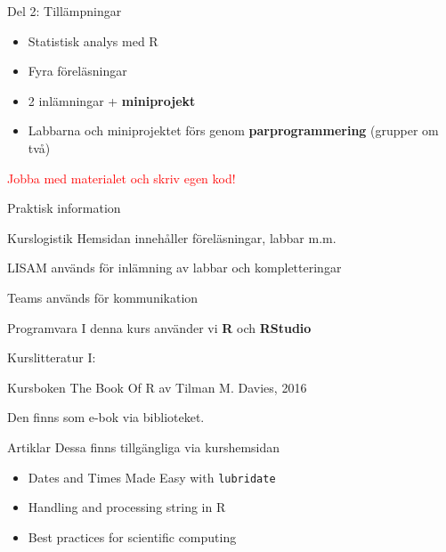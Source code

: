 \documentclass[
  10pt,
  ignorenonframetext,
]{beamer}
\providecommand{\tightlist}{%
  \setlength{\itemsep}{0pt}\setlength{\parskip}{0pt}}
\begin{document}
\begin{frame}{Del 2: Tillämpningar}
\protect\hypertarget{del-2-tilluxe4mpningar}{}
\begin{itemize}
\tightlist
\item
  Statistisk analys med R
\item
  Fyra föreläsningar
\item
  2 inlämningar + \textbf{miniprojekt}
\item
  Labbarna och miniprojektet förs genom \textbf{parprogrammering} (grupper om två)
\end{itemize}

\pause

\textcolor{red}{Jobba med materialet och skriv egen kod!}
\end{frame}

\begin{frame}{Praktisk information}
\protect\hypertarget{praktisk-information}{}
\begin{block}{Kurslogistik}
\protect\hypertarget{kurslogistik}{}
Hemsidan innehåller föreläsningar, labbar m.m.

LISAM används för inlämning av labbar och kompletteringar

Teams används för kommunikation
\end{block}

\begin{block}{Programvara}
\protect\hypertarget{programvara}{}
I denna kurs använder vi \textbf{R} och \textbf{RStudio}
\end{block}
\end{frame}

\begin{frame}{Kurslitteratur I:}
\protect\hypertarget{kurslitteratur-i}{}
\begin{block}{Kursboken}
\protect\hypertarget{kursboken}{}
The Book Of R av Tilman M. Davies, 2016

Den finns som e-bok via biblioteket.
\end{block}

\begin{block}{Artiklar}
\protect\hypertarget{artiklar}{}
Dessa finns tillgängliga via kurshemsidan

\begin{itemize}
\tightlist
\item
  Dates and Times Made Easy with \texttt{lubridate}
\item
  Handling and processing string in R
\item
  Best practices for scientific computing
\end{itemize}
\end{block}
\end{frame}
\end{document}
